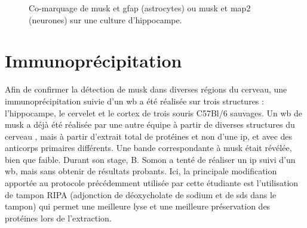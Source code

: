 \begin{figure}
\begin{subfigure}[h]{0.329\textwidth}
		\end{subfigure}
	\caption{Co-marquage de \gls{musk} et \gls{gfap} (astrocytes) ou \gls{musk} et \gls{map2} (neurones) sur une culture d'hippocampe.}
	\label{fig:MuSKMAP2GFAP}
	\end{figure}
	\FloatBarrier

\section{Immunoprécipitation}
\label{sec:IPresultat}
	Afin de confirmer la détection de \gls{musk} dans diverses régions du cerveau, une immunoprécipitation suivie d'un \gls{wb} a été réalisée sur trois structures : l'hippocampe, le cervelet et le cortex de trois souris C57Bl/6 sauvages. Un \gls{wb} de \gls{musk} a déjà été réalisée par une autre équipe à partir de diverses structures du cerveau \cite{Garcia-Osta2006}, mais à partir d'extrait total de protéines et non d'une \gls{ip}, et avec des anticorps primaires différents. Une bande correspondante à \gls{musk} était révélée, bien que faible. Durant son stage, B. Somon a tenté de réaliser un \gls{ip} suivi d'un \gls{wb}, mais sans obtenir de résultats probants. Ici, la principale modification apportée au protocole précédemment utilisée par cette étudiante est l'utilisation de tampon RIPA (adjonction de déoxycholate de sodium et de \acrshort{sds} dans le tampon) qui permet une meilleure lyse et une meilleure préservation des protéines lors de l'extraction.
	
